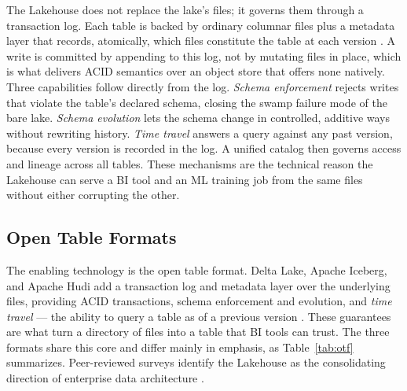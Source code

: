 The Lakehouse does not replace the lake's files; it governs them through a transaction log. Each table is backed by ordinary columnar files plus a metadata layer that records, atomically, which files constitute the table at each version \parencite{deltalake2020, armbrust2021}. A write is committed by appending to this log, not by mutating files in place, which is what delivers ACID semantics over an object store that offers none natively. Three capabilities follow directly from the log. \textit{Schema enforcement} rejects writes that violate the table's declared schema, closing the swamp failure mode of the bare lake. \textit{Schema evolution} lets the schema change in controlled, additive ways without rewriting history. \textit{Time travel} answers a query against any past version, because every version is recorded in the log. A unified catalog then governs access and lineage across all tables. These mechanisms are the technical reason the Lakehouse can serve a BI tool and an ML training job from the same files without either corrupting the other.

\subsection{Open Table Formats}
\label{subsec:ch2-otf}

The enabling technology is the open table format. Delta Lake, Apache Iceberg, and Apache Hudi add a transaction log and metadata layer over the underlying files, providing ACID transactions, schema enforcement and evolution, and \textit{time travel} --- the ability to query a table as of a previous version \parencite{deltalake2020, armbrust2021}. These guarantees are what turn a directory of files into a table that BI tools can trust. The three formats share this core and differ mainly in emphasis, as Table~\ref{tab:otf} summarizes. Peer-reviewed surveys identify the Lakehouse as the consolidating direction of enterprise data architecture \parencite{harby2024, schneider2024, nambiar2022}.

